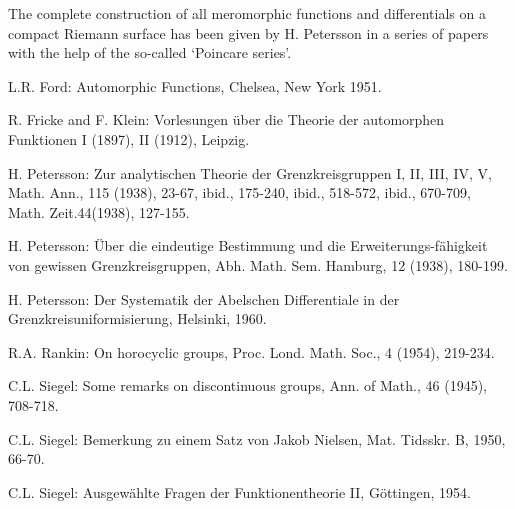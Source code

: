 The complete construction of all meromorphic functions and
differentials on a compact Riemann surface has been given by
H. Petersson in a series of papers with the help of the so-called
`Poincare series'.

\begin{thebibliography}{99}\pageoriginale
{} L.R. Ford: Automorphic Functions, Chelsea, New York 1951.

 R. Fricke and F. Klein: Vorlesungen \"uber die Theorie der
  automorphen Funktionen I (1897), II (1912), Leipzig.

 H. Petersson: Zur analytischen Theorie der Grenzkreisgruppen
  I, II, III, IV, V, Math. Ann., 115 (1938), 23-67, ibid., 175-240,
  ibid., 518-572, ibid., 670-709, Math. Zeit.44(1938), 127-155.

 H. Petersson: \"Uber die eindeutige Bestimmung und die
  Erweiterungs-f\"ahigkeit von gewissen Grenzkreisgruppen,
  Abh. Math. Sem. Hamburg, 12 (1938), 180-199.

 H. Petersson: Der Systematik der Abelschen Differentiale in
  der Grenzkreisuniformisierung, Helsinki, 1960.

 R.A. Rankin: On horocyclic groups, Proc. Lond. Math. Soc., 4
  (1954), 219-234.

 C.L. Siegel: Some remarks on discontinuous groups, Ann. of
  Math., 46 (1945), 708-718.

 C.L. Siegel: Bemerkung zu einem Satz von Jakob Nielsen,
  Mat. Tidsskr. B, 1950, 66-70.

 C.L. Siegel: Ausgew\"ahlte Fragen der Funktionentheorie II,
  G\"ottingen, 1954.
\end{thebibliography}
